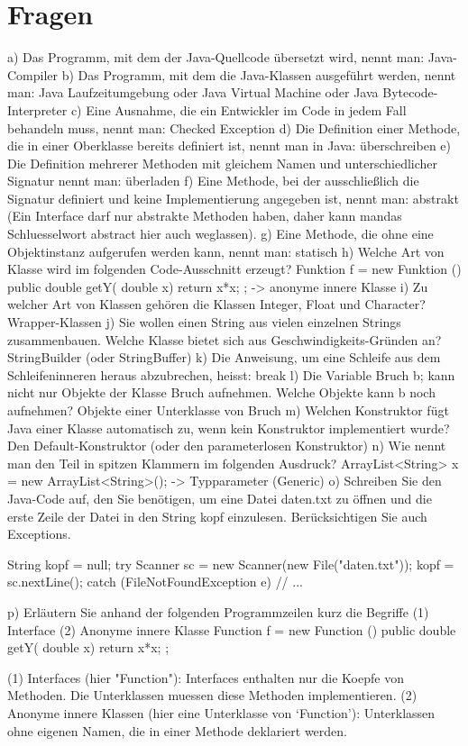 \section{Fragen}
a) Das Programm, mit dem der Java-Quellcode übersetzt wird, nennt man:
Java-Compiler
b) Das Programm, mit dem die Java-Klassen ausgeführt werden, nennt man:
Java Laufzeitumgebung oder Java Virtual Machine oder Java Bytecode-Interpreter
c) Eine Ausnahme, die ein Entwickler im Code in jedem Fall behandeln muss, nennt man:
Checked Exception
d) Die Definition einer Methode, die in einer Oberklasse bereits definiert ist, nennt man in Java:
überschreiben
e) Die Definition mehrerer Methoden mit gleichem Namen und unterschiedlicher Signatur nennt man:
überladen
f) Eine Methode, bei der ausschließlich die Signatur definiert und keine Implementierung angegeben ist, nennt man:
abstrakt (Ein Interface darf nur abstrakte Methoden haben, daher kann mandas Schluesselwort abstract hier auch weglassen).
g) Eine Methode, die ohne eine Objektinstanz aufgerufen werden kann, nennt man:
statisch
h) Welche Art von Klasse wird im folgenden Code-Ausschnitt erzeugt?
Funktion f = new Funktion () {
public double getY( double x) {
return x*x;
}
};
-> anonyme innere Klasse
i) Zu welcher Art von Klassen gehören die Klassen Integer, Float und Character?
Wrapper-Klassen
j) Sie wollen einen String aus vielen einzelnen Strings zusammenbauen. Welche Klasse bietet sich aus Geschwindigkeits-Gründen an?
StringBuilder (oder StringBuffer)
k) Die Anweisung, um eine Schleife aus dem Schleifeninneren heraus abzubrechen, heisst:
break
l) Die Variable Bruch b; kann nicht nur Objekte der Klasse Bruch aufnehmen. Welche Objekte kann b noch aufnehmen?
Objekte einer Unterklasse von Bruch
m) Welchen Konstruktor fügt Java einer Klasse automatisch zu, wenn kein Konstruktor implementiert wurde?
Den Default-Konstruktor (oder den parameterlosen Konstruktor)
n) Wie nennt man den Teil in spitzen Klammern im folgenden Ausdruck?
ArrayList<String> x = new ArrayList<String>();
-> Typparameter (Generic)
o) Schreiben Sie den Java-Code auf, den Sie benötigen, um eine Datei daten.txt zu öffnen und die erste Zeile der Datei in den String kopf einzulesen. Berücksichtigen Sie auch Exceptions.

String kopf = null;
try {
    Scanner sc = new Scanner(new File("daten.txt"));
    kopf = sc.nextLine();
} catch (FileNotFoundException e) {
    // ...
}

p) Erläutern Sie anhand der folgenden Programmzeilen kurz die Begriffe
(1) Interface
(2) Anonyme innere Klasse
 Function f = new Function () {
 public double getY( double x) {
 return x*x;
 }
 };

(1) Interfaces (hier "Function"): Interfaces enthalten nur die Koepfe von
    Methoden. Die Unterklassen muessen diese Methoden implementieren.
(2) Anonyme innere Klassen (hier eine Unterklasse von `Function'):
    Unterklassen ohne eigenen Namen, die in einer Methode deklariert
    werden.